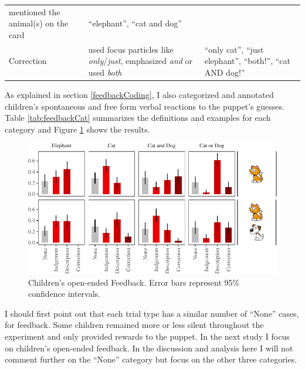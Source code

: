 \documentclass[man]{apa6}
\theoremstyle{definition}
\theoremstyle{definition}
\theoremstyle{definition}
\theoremstyle{remark}
\begin{document}
\begin{longtable}[]{@{}lll@{}}
\begin{minipage}[t]{0.46\columnwidth}
mentioned the animal(s) on the card\strut
\end{minipage} & \begin{minipage}[t]{0.32\columnwidth}\raggedright\strut
\enquote{elephant}, \enquote{cat and dog}\strut
\end{minipage}\tabularnewline
\begin{minipage}[t]{0.11\columnwidth}\raggedright\strut
Correction\strut
\end{minipage} & \begin{minipage}[t]{0.46\columnwidth}\raggedright\strut
used focus particles like \emph{only}/\emph{just}, emphasized \emph{and}
or used \emph{both}\strut
\end{minipage} & \begin{minipage}[t]{0.32\columnwidth}\raggedright\strut
\enquote{only cat}, \enquote{just elephant}, \enquote{both!},
\enquote{cat AND dog!}\strut
\end{minipage}\tabularnewline
\bottomrule
\end{longtable}

As explained in section \ref{feedbackCoding}, I also categorized and
annotated children's spontaneous and free form verbal reactions to the
puppet's guesses. Table \ref{tab:feedbackCat} summarizes the definitions
and examples for each category and Figure \ref{fig:feedbackData} shows
the results.

\begin{figure}[h]

{\centering \includegraphics{figs/feedbackData-1} 

}

\caption{Children's open-ended Feedback. Error bars represent 95\% confidence intervals.}\label{fig:feedbackData}
\end{figure}

I should first point out that each trial type has a similar number of
\enquote{None} cases, for feedback. Some children remained more or less
silent throughout the experiment and only provided rewards to the
puppet. In the next study I focus on children's open-ended feedback. In
the discussion and analysis here I will not comment further on the
\enquote{None} category but focus on the other three categories.
\end{document}
